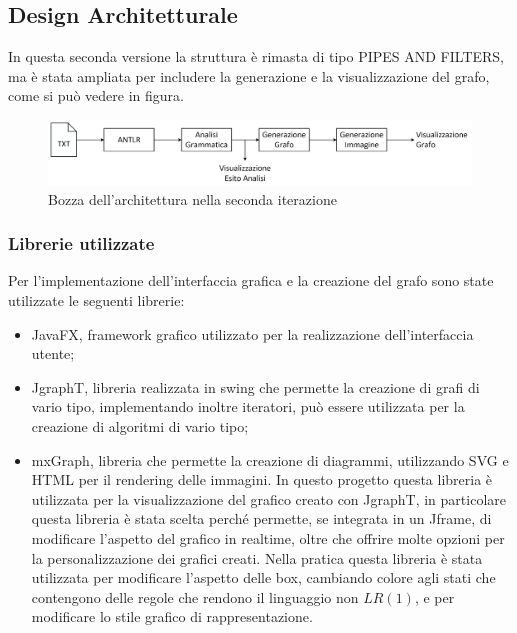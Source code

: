 \documentclass[12pt]{article}
\begin{document}
\subsection{Design Architetturale}
In questa seconda versione la struttura è rimasta di tipo PIPES AND FILTERS, ma è stata ampliata per includere la generazione e la visualizzazione del grafo, come si può vedere in figura.
\begin{figure}[h]
\centering
\includegraphics[width=\textwidth]{immagini/bozzaArchitettura_v2.png}
\caption{Bozza dell'architettura nella seconda iterazione}
\end{figure}
\pagebreak
\subsubsection{Librerie utilizzate}
Per l'implementazione dell'interfaccia grafica e la creazione del grafo sono state utilizzate le seguenti librerie:
\begin{itemize}
\item JavaFX, framework grafico utilizzato per la realizzazione dell'interfaccia utente;
\item JgraphT, libreria realizzata in swing che permette la creazione di grafi di vario tipo, implementando inoltre iteratori, può essere utilizzata per la creazione di algoritmi di vario tipo;
\item mxGraph, libreria che permette la creazione di diagrammi, utilizzando SVG e HTML per il rendering delle immagini. In questo progetto questa libreria è utilizzata per la visualizzazione del grafico creato con JgraphT, in particolare questa libreria è stata scelta perché permette, se integrata in un Jframe, di modificare l'aspetto del grafico in realtime, oltre che offrire molte opzioni per la personalizzazione dei grafici creati.
Nella pratica questa libreria è stata utilizzata per modificare l'aspetto delle box, cambiando colore agli stati che contengono delle regole che rendono il linguaggio non $LR \left( 1 \right)$, e per modificare lo stile grafico di rappresentazione.
\end{itemize}
\end{document}
